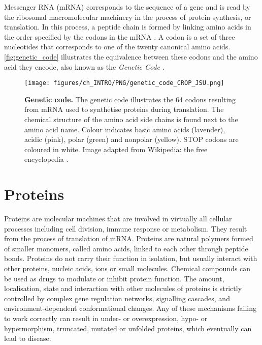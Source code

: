 Messenger RNA (mRNA) corresponds to the sequence of a gene and is read by the ribosomal macromolecular machinery in the process of protein synthesis, or translation. In this process, a peptide chain is formed by linking amino acids in the order specified by the codons in the mRNA \cite{CRICK_1957_CODE}. A codon is a set of three nucleotides that corresponds to one of the twenty canonical amino acids. \autoref{fig:genetic_code} illustrates the equivalence between these codons and the amino acid they encode, also known as the \textit{Genetic Code} \cite{GAMOW_1954_CODE}.

\begin{figure}[htb!]
    \centering
    \texttt{[image: figures/ch\_INTRO/PNG/genetic\_code\_CROP\_JSU.png]}
    \caption[Genetic code]{\textbf{Genetic code.} The genetic code illustrates the 64 codons resulting from mRNA used to synthetise proteins during translation. The chemical structure of the amino acid side chains is found next to the amino acid name. Colour indicates basic amino acids (lavender), acidic (pink), polar (green) and nonpolar (yellow). STOP codons are coloured in white. Image adapted from Wikipedia: the free encyclopedia \cite{genetic_code_image}.}
    \label{fig:genetic_code}
\end{figure}

\section{Proteins}

Proteins are molecular machines that are involved in virtually all cellular processes including cell division, immune response or metabolism. They result from the process of translation of mRNA. Proteins are natural polymers formed of smaller monomers, called amino acids, linked to each other through peptide bonds. Proteins do not carry their function in isolation, but usually interact with other proteins, nucleic acids, ions or small molecules. Chemical compounds can be used as drugs to modulate or inhibit protein function. The amount, localisation, state and interaction with other molecules of proteins is strictly controlled by complex gene regulation networks, signalling cascades, and environment-dependent conformational changes. Any of these mechanisms failing to work correctly can result in under- or overexpression, hypo- or hypermorphism, truncated, mutated or unfolded proteins, which eventually can lead to disease. %

